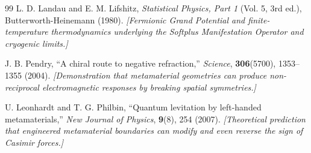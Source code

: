 \documentclass[11pt, letterpaper]{article}
\theoremstyle{definition}
\theoremstyle{remark}
\begin{document}
\begin{thebibliography}{99}
L. D. Landau and E. M. Lifshitz,
\textit{Statistical Physics, Part 1} (Vol. 5, 3rd ed.), Butterworth-Heinemann (1980).
\newblock \textit{[Fermionic Grand Potential and finite-temperature thermodynamics underlying the Softplus Manifestation Operator and cryogenic limits.]}

J. B. Pendry,
``A chiral route to negative refraction,''
\textit{Science}, \textbf{306}(5700), 1353--1355 (2004).
\newblock \textit{[Demonstration that metamaterial geometries can produce non-reciprocal electromagnetic responses by breaking spatial symmetries.]}

U. Leonhardt and T. G. Philbin,
``Quantum levitation by left-handed metamaterials,''
\textit{New Journal of Physics}, \textbf{9}(8), 254 (2007).
\newblock \textit{[Theoretical prediction that engineered metamaterial boundaries can modify and even reverse the sign of Casimir forces.]}

\end{thebibliography}
\end{document}
